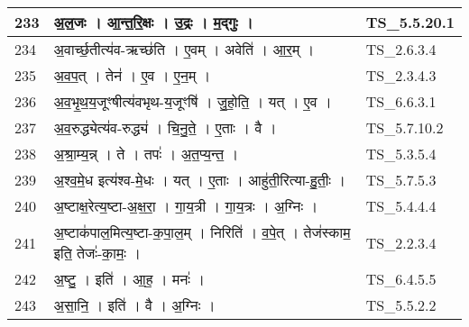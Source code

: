 \documentclass[17pt]{extarticle}
\begin{document}
\begin{longtable}{||p{0.4in}||p{4.9in}||p{0.9in}||}
    \hline
        
    233 & अ॒ल॒जः   ।   आ॒न्त॒रि॒क्षः   ।   उ॒द्रः   ।   म॒द्गुः   ।    & TS\_5.5.20.1       \\
    
    \hline
        
    234 & अ॒वार्च्छ॒तीत्य॑व{-}ऋच्छ॑ति   ।   ए॒वम्   ।   अवेति॑   ।   आ॒र॒म्   ।    & TS\_2.6.3.4       \\
    
    \hline
        
    235 & अ॒व॒प॒त्   ।   तेन॑   ।   ए॒व   ।   ए॒न॒म्   ।    & TS\_2.3.4.3       \\
    
    \hline
        
    236 & अ॒व॒भृ॒थ॒य॒जूꣳषीत्य॑वभृथ{-}य॒जूꣳषि॑   ।   जु॒हो॒ति॒   ।   यत्   ।   ए॒व   ।    & TS\_6.6.3.1       \\
    
    \hline
        
    237 & अ॒व॒रुद्ध्येत्य॑व{-}रुद्ध्य॑   ।   चि॒नु॒ते॒   ।   ए॒ताः   ।   वै   ।    & TS\_5.7.10.2       \\
    
    \hline
        
    238 & अ॒श्रा॒म्य॒न्न्   ।   ते   ।   तपः॑   ।   अ॒त॒प्य॒न्त॒   ।    & TS\_5.3.5.4       \\
    
    \hline
        
    239 & अ॒श्व॒मे॒ध इत्य॑श्व{-}मे॒धः   ।   यत्   ।   ए॒ताः   ।   आहु॑ती॒रित्या{-}हु॒तीः॒   ।    & TS\_5.7.5.3       \\
    
    \hline
        
    240 & अ॒ष्टाक्ष॒रेत्य॒ष्टा{-}अ॒क्ष॒रा॒   ।   गा॒य॒त्री   ।   गा॒य॒त्रः   ।   अ॒ग्निः   ।    & TS\_5.4.4.4       \\
    
    \hline
        
    241 & अ॒ष्टाक॑पाल॒मित्य॒ष्टा{-}क॒पा॒ल॒म्   ।   निरिति॑   ।   व॒पे॒त्   ।   तेज॑स्काम॒ इति॒ तेजः॑{-}का॒मः॒   ।    & TS\_2.2.3.4       \\
    
    \hline
        
    242 & अ॒ष्टु॒   ।   इति॑   ।   आ॒ह॒   ।   मनः॑   ।    & TS\_6.4.5.5       \\
    
    \hline
        
    243 & अ॒सा॒नि॒   ।   इति॑   ।   वै   ।   अ॒ग्निः   ।    & TS\_5.5.2.2       \\
    

\end{longtable}
\end{document}
